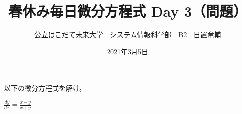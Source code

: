 \documentclass[dvipdfmx,uplatex]{jsarticle}
\title{春休み毎日微分方程式 Day 3（問題）}
\author{公立はこだて未来大学　システム情報科学部　B2　日置竜輔}
\date{2021年3月5日}
\begin{document}
\begin{spacing}{1.6}
\maketitle

以下の微分方程式を解け。
\begin{qparts}
    \qpart $ \displaystyle \frac{dy}{dx} = \frac{x - y}{x + y} $ \\
\end{qparts}
\end{spacing}
\end{document}
